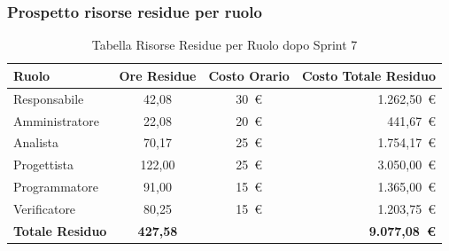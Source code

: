 \subsubsection{Prospetto risorse residue per ruolo}
\begin{table}[H]
    \centering
    \renewcommand{\arraystretch}{1.3}
    \begin{tabularx}{\textwidth}{|X|c|c|r|}
        \hline
        \textbf{Ruolo} & \textbf{Ore Residue} & \textbf{Costo Orario} &
        \textbf{Costo Totale Residuo} \\
        \hline
        Responsabile   & 42,08 & 30~\euro & 1.262{,}50~\euro \\
        Amministratore & 22,08 & 20~\euro &   441{,}67~\euro \\
        Analista       & 70,17 & 25~\euro & 1.754{,}17~\euro \\
        Progettista    & 122,00 & 25~\euro & 3.050{,}00~\euro \\
        Programmatore  & 91,00 & 15~\euro & 1.365{,}00~\euro \\
        Verificatore   & 80,25 & 15~\euro & 1.203{,}75~\euro \\
        \hline
        \textbf{Totale Residuo} & \textbf{427,58} & &
        \textbf{9.077{,}08~\euro} \\
        \hline
    \end{tabularx}
    \caption{Tabella Risorse Residue per Ruolo dopo Sprint 7}
\end{table}

